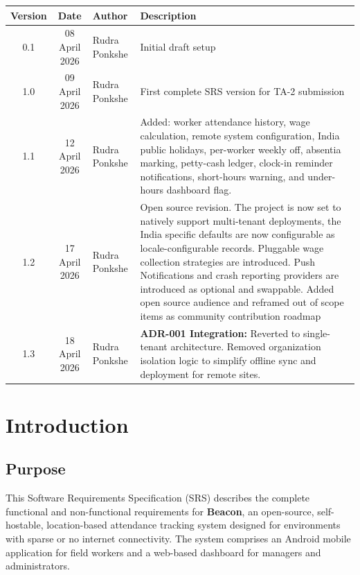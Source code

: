 \documentclass[12pt, a4paper]{article}
\begin{document}
\begin{tabularx}{\linewidth}{@{} c c l X @{}}
    \toprule
    \textbf{Version} & \textbf{Date} & \textbf{Author} & \textbf{Description} \\
    \midrule
    0.1 & 08 April 2026 & Rudra Ponkshe & Initial draft setup \\
    1.0 & 09 April 2026 & Rudra Ponkshe & First complete SRS version for TA-2 submission \\
    1.1 & 12 April 2026 & Rudra Ponkshe & Added: worker attendance history, wage calculation,
                                     remote system configuration, India public holidays,
                                     per-worker weekly off, absentia marking, petty-cash
                                     ledger, clock-in reminder notifications, short-hours
                                     warning, and under-hours dashboard flag. \\
    1.2 & 17 April 2026 & Rudra Ponkshe & Open source revision. The project is now set to
    natively support multi-tenant deployments, the India specific defaults are now configurable as locale-configurable records. Pluggable wage collection strategies are introduced. Push Notifications and crash reporting providers are introduced as optional and swappable. Added open source audience and reframed out of scope items as community contribution roadmap\\
    1.3 & 18 April 2026 & Rudra Ponkshe & \textbf{ADR-001 Integration:} Reverted to single-tenant architecture. Removed organization isolation logic to simplify offline sync and deployment for remote sites. \\
    \bottomrule
\end{tabularx}

\newpage
\tableofcontents
\newpage

\section{Introduction}

\subsection{Purpose}
This Software Requirements Specification (SRS) describes the complete
functional and non-functional requirements for \textbf{Beacon}, an
open-source, self-hostable, location-based attendance tracking system
designed for environments with sparse or no internet connectivity.
The system comprises an Android mobile application for field workers and
a web-based dashboard for managers and administrators.
\end{document}
